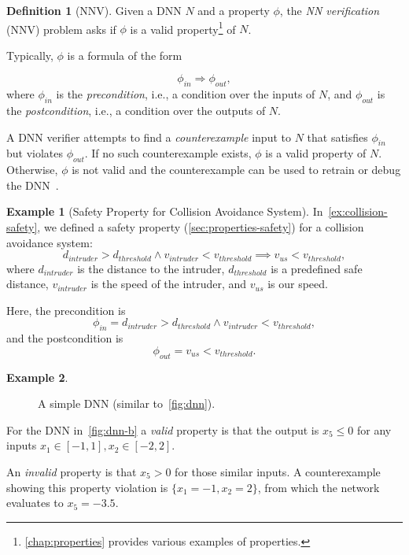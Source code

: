 \documentclass[oneside,11pt,dvipsnames]{book}
\numberwithin{equation}{section}
\theoremstyle{definition}
\newtheorem{definition}{Definition}[section]
\newtheorem{example}{Example}[section]
\theoremstyle{remark}
\begin{document}
\begin{definition}[NNV]
Given a DNN \(N\) and a property $\phi$, the \emph{NN verification} (NNV) problem asks if $\phi$ is a valid property\footnote{\autoref{chap:properties} provides various examples of properties.} of $N$.

Typically, $\phi$ is a formula of the form 

\[
\phi_{in} \Rightarrow \phi_{out},
\]
where $\phi_{in}$ is the \emph{precondition}, i.e., a condition over the inputs of $N$, and $\phi_{out}$ is the \emph{postcondition}, i.e., a condition over the outputs of $N$.

A DNN verifier attempts to find a \emph{counterexample} input to $N$ that satisfies $\phi_{in}$ but violates $\phi_{out}$.  If no such counterexample exists, $\phi$ is a valid property of $N$. Otherwise, $\phi$ is not valid and the counterexample can be used to retrain or debug the DNN~\cite{huang2017safety}.
\end{definition}



\begin{example}[Safety Property for Collision Avoidance System]
    In~\autoref{ex:collision-safety}, we defined a safety property (\autoref{sec:properties-safety}) for a collision avoidance system: 
\[
d_{intruder} > d_{threshold} \land v_{intruder} < v_{threshold} \implies v_{us} < v_{threshold},
\]
where $d_{intruder}$ is the distance to the intruder, $d_{threshold}$ is a predefined safe distance, $v_{intruder}$ is the speed of the intruder, and $v_{us}$ is our speed.  

Here, the precondition is 
\[
\phi_{in} = d_{intruder} > d_{threshold} \land v_{intruder} < v_{threshold},
\]
and the postcondition is 
\[
\phi_{out} = v_{us} < v_{threshold}.
\]
\end{example}




\begin{example}\label{ex:dnn-b}

\begin{figure}
\centering
{}
\caption{\label{fig:dnn-b}A simple DNN (similar to~\autoref{fig:dnn}).}
\end{figure}

For the DNN in~\autoref{fig:dnn-b} a \emph{valid} property is that the output is $x_5 \le 0$ for any inputs $x_1 \in [-1,1], x_2\in[-2,2]$.

An \emph{invalid} property is that $x_5 > 0$ for those similar inputs.
A counterexample showing this property violation is $\{x_1=-1, x_2=2\}$, from which the network evaluates to $x_5=-3.5$. 
\end{example}
\end{document}

